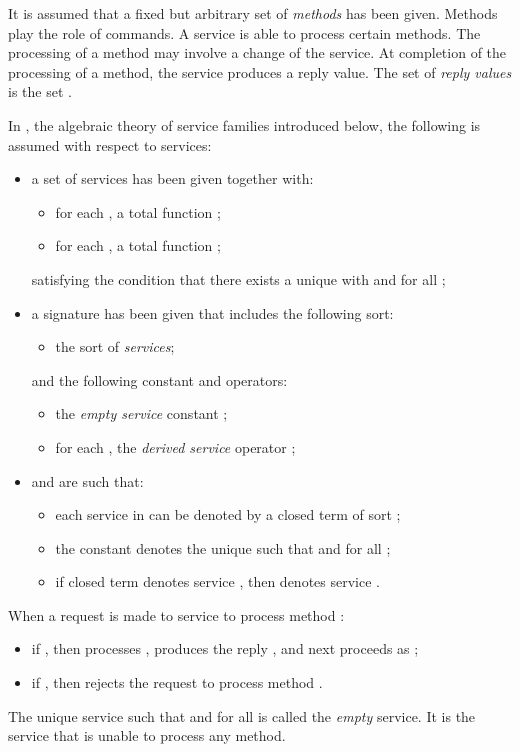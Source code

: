 \documentclass[fleqn]{llncs}
\begin{document}
It is assumed that a fixed but arbitrary set  of \emph{methods}
has been given.
Methods play the role of commands.
A service is able to process certain methods.
The processing of a method may involve a change of the service.
At completion of the processing of a method, the service produces a
reply value.
The set  of \emph{reply values} is the set
.

In \SFA, the algebraic theory of service families introduced below, the
following is assumed with respect to services:
\begin{itemize}
\item
a set  of services has been given together with:
\begin{itemize}
\item
for each ,
a total function ;
\item
for each ,
a total function ;
\end{itemize}
satisfying the condition that there exists a unique 
with  and  for all
;
\item
a signature  has been given that includes the following
sort:
\begin{itemize}
\item
the sort  of \emph{services};
\end{itemize}
and the following constant and operators:
\begin{itemize}
\item
the \emph{empty service} constant ;
\item
for each ,
the \emph{derived service} operator
;
\end{itemize}
\item
 and  are such that:
\begin{itemize}
\item
each service in  can be denoted by a closed term of sort
;
\item
the constant  denotes the unique  such
that  and  for all
;
\item
if closed term  denotes service , then  denotes
service .
\end{itemize}
\end{itemize}

When a request is made to service  to process method :
\begin{itemize}
\item
if , then  processes , produces the reply
, and next proceeds as ;
\item
if , then  rejects the request to process
method .
\end{itemize}
The unique service  such that  and
 for all  is called the \emph{empty}
service.
It is the service that is unable to process any method.
\end{document}
